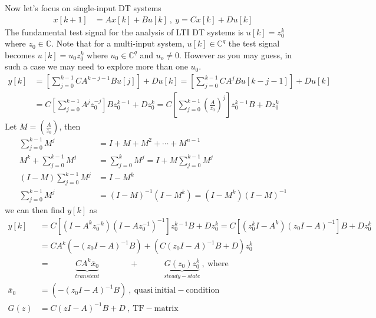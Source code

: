 \documentclass[twoside]{article}
\begin{document}
Now let's focus on single-input DT systems 
%
\begin{align*}
       x[k+1] &= A x[k] + B u[k] \ , \ y = C x[k] + D u[k]
\end{align*}
%
The fundamental test signal for the analysis of LTI DT systems is $u[k] = z_0^{k}$ where $z_0 \in \mathbb{C}$. Note that for a multi-input system, $u[k] \in \mathbb{C}^q$ the test signal becomes $u[k] = u_0 z_0^{k}$ where $u_0 \in \mathbb{C}^q$ and $u_o \neq 0$. However as you may guess, in such a case we may need to explore more than one $u_0$.
%
\begin{align*}
 y[k] &= \left[ \sum\limits_{j = 0}^{k-1} C A^{k-j-1} B u[j] \right] + D u[k] = \left[ \sum\limits_{j = 0}^{k-1} C A^{j} B u[k-j-1] \right] + D u[k] 
 \\[1ex]
 &= C \left[ \sum\limits_{j = 0}^{k-1} A^{j} z^{-j}_0 \right] B z_0^{k-1} + D z_0^k = C \left[ \sum\limits_{j = 0}^{k-1} \left( \frac{A}{z_0} \right)^j \right] z_0^{k-1} B + D z_0^k 
\end{align*}
%
Let $M = \left( \frac{A}{z_0} \right)$, then 
%
\begin{align*}
\sum\limits_{j = 0}^{k-1} M^j &= I + M + M^2 + \cdots + M^{n-1}
\\[1ex]
M^k + \sum\limits_{j = 0}^{k-1} M^j &= \sum\limits_{j = 0}^{k} M^j = I + M \sum\limits_{j = 0}^{k-1} M^j
\\[1ex]
(I - M) \sum\limits_{j = 0}^{k-1} M^j &= I - M^k 
\\[1ex]
\sum\limits_{j = 0}^{k-1} M^j &= (I - M)^{-1} \left( I - M^k  \right) = \left( I - M^k  \right) (I - M)^{-1}
\end{align*}
%
we can then find $y[k]$ as
%
\begin{align*}
 y[k] &= C \left[ \left( I - A^k z_0^{-k}  \right) \left(I - A z_0^{-1} \right)^{-1} \right] z_0^{k-1} B + D z_0^k
 = C \left[ \left( z_0^k I - A^k \right) \left(z_0 I - A \right)^{-1} \right] B + D z_0^k
 \\[1ex]
 &= C A^k \left( - \left(z_0 I - A \right)^{-1} B \right) + \left( C \left(z_0 I - A \right)^{-1} B + D \right) z_0^k
 \\[1ex]
  &= \quad \quad  \quad  \underbrace{C A^k \bar{x}_0}_{transient}  \quad \quad \quad \ \ \, +
   \quad \quad \quad \underbrace{G(z_0) z_0^k}_{steady-state} \ , \ \mathrm{where}
   \\[1ex]
   \bar{x}_0 &= \left( - \left(z_0 I - A \right)^{-1} B \right) \ , \ \mathrm{quasi} \ \mathrm{initial-condition}
   \\[1ex]
   G(z) &= C (z I - A)^{-1} B + D \ , \ \mathrm{TF-matrix} 
\end{align*}
\end{document}
